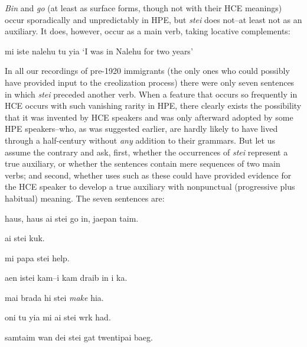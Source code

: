 \textit{Bin} and \textit{go} (at least as surface forms, though not with their HCE meanings) occur sporadically and unpredictably in HPE, but \textit{stei} does not--at least not as an auxiliary. It does, however, occur as a main verb, taking locative complements:

\ea\label{ex:44}
 mi iste nalehu tu yia
\glt `I was in Nalehu for two years'
\z

\noindent In all our recordings of pre-1920 immigrants (the only ones who could possibly have provided input to the creolization process) there were only seven sentences in which \textit{stei} preceded another verb. When a feature that occurs so frequently in HCE occurs with such vanishing rarity in HPE, there clearly exists the possibility that it was invented by HCE speakers and was only afterward adopted by some HPE speakers--who, as was suggested earlier, are hardly likely to have lived through a half-century without \textit{any} addition to their grammars. But let us assume the contrary and ask, first, whether the occurrences of \textit{stei} represent
% 
a true auxiliary, or whether the sentences contain mere sequences of two main verbs; and second, whether uses such as these could have provided evidence for the HCE speaker to develop a true auxiliary with nonpunctual (progressive plus habitual) meaning. The seven sentences are:

\ea\label{ex:45}
 haus, haus ai stei go in, jaepan taim.
\z

\ea\label{ex:46}
 ai stei kuk.
\z

\ea\label{ex:47}
 mi papa stei help.
\z

\ea\label{ex:48}
 aen istei kam--i kam draib in i ka.
\z

\ea\label{ex:49}
 mai brada hi stei \textit{make} hia.
\z

\ea\label{ex:50}
oni tu yia mi ai stei wrk had.
\z

\ea\label{ex:51}
samtaim wan dei stei gat twentipai baeg.
\z

